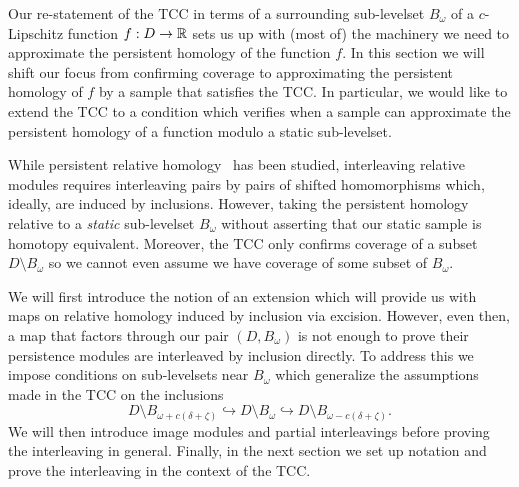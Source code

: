 
Our re-statement of the TCC in terms of a surrounding sub-levelset $B_\omega$ of a $c$-Lipschitz function $f : D\to \mathbb{R}$ sets us up with (most of) the machinery we need to approximate the persistent homology of the function $f$.
In this section we will shift our focus from confirming coverage to approximating the persistent homology of $f$ by a sample that satisfies the TCC.
In particular, we would like to extend the TCC to a condition which verifies when a sample can approximate the persistent homology of a function modulo a static sub-levelset.

While persistent relative homology~\cite{todo} has been studied, interleaving relative modules requires interleaving pairs by pairs of shifted homomorphisms which, ideally, are induced by inclusions.
However, taking the persistent homology relative to a \emph{static} sub-levelset $B_\omega$ without asserting that our static sample is homotopy equivalent.
Moreover, the TCC only confirms coverage of a subset $D\setminus B_\omega$ so we cannot even assume we have coverage of some subset of $B_\omega$.

We will first introduce the notion of an extension which will provide us with maps on relative homology induced by inclusion via excision.
However, even then, a map that factors through our pair $(D, B_\omega)$ is not enough to prove their persistence modules are interleaved by inclusion directly.
To address this we impose conditions on sub-levelsets near $B_\omega$ which generalize the assumptions made in the TCC on the inclusions
\[ D\setminus B_{\omega+c(\delta+\zeta)}\hookrightarrow D\setminus B_\omega\hookrightarrow D\setminus B_{\omega-c(\delta+\zeta)}.\]
We will then introduce image modules and partial interleavings before proving the interleaving in general.
Finally, in the next section we set up notation and prove the interleaving in the context of the TCC.
